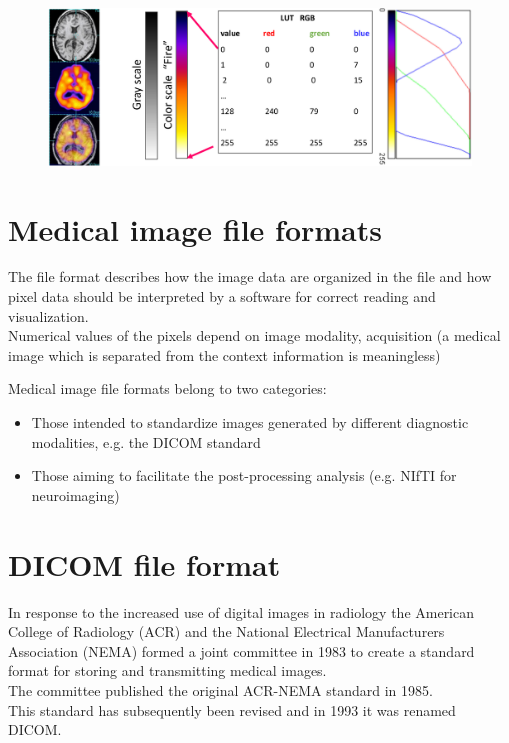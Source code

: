 \begin{figure}[ht]
	\centering
	\includegraphics[width=0.9\linewidth]{figure_med/luts}
\end{figure}
\FloatBarrier

\section{Medical image file formats}

The file format describes how the image data are organized in the file and how pixel data should be interpreted by a software for correct reading and visualization.\\
Numerical values of the pixels depend on image modality, acquisition (a medical image which is separated from the context information is meaningless)

Medical image file formats belong to two categories:
\begin{itemize}
	\item Those intended to standardize images generated by different diagnostic modalities, e.g. the DICOM standard
	\item Those aiming to facilitate the post-processing analysis (e.g. NIfTI for neuroimaging)
\end{itemize}

\section{DICOM file format}
In response to the increased use of digital images in radiology the American College of Radiology (ACR) and the National Electrical Manufacturers Association (NEMA) formed a joint committee in 1983 to create a standard format for storing and transmitting medical images.\\
The committee published the original ACR-NEMA standard in 1985.\\
This standard has subsequently been revised and in 1993 it was renamed DICOM.

